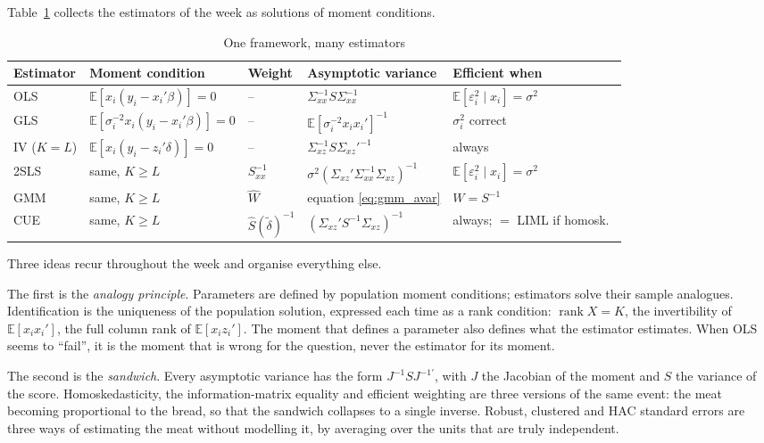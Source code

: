\documentclass[11pt,a4paper]{article}
\newcommand{\E}{\mathbb{E}}
\newcommand{\rank}{\operatorname{rank}}
\newcommand{\Sxx}{S_{xx}}
\newcommand{\sxx}{\Sigma_{xx}}
\newcommand{\sxz}{\Sigma_{xz}}
\begin{document}
Table~\ref{tab:synth} collects the estimators of the week as solutions of moment conditions.

\begin{table}[h]
\centering\footnotesize
\setlength{\tabcolsep}{4pt}
\caption{One framework, many estimators}\label{tab:synth}
\begin{tabular}{@{}lllll@{}}
\toprule
Estimator & Moment condition & Weight & Asymptotic variance & Efficient when \\
\midrule
OLS & $\E[x_i(y_i-x_i'\beta)]=0$ & -- & $\sxx^{-1}S\sxx^{-1}$ & $\E[\varepsilon_i^2\mid x_i]=\sigma^2$ \\
GLS & $\E[\sigma_i^{-2}x_i(y_i-x_i'\beta)]=0$ & -- & $\E[\sigma_i^{-2}x_ix_i']^{-1}$ & $\sigma_i^2$ correct \\
IV ($K=L$) & $\E[x_i(y_i-z_i'\delta)]=0$ & -- & $\sxz^{-1}S\sxz'^{-1}$ & always \\
2SLS & same, $K\geq L$ & $\Sxx^{-1}$ & $\sigma^2(\sxz'\sxx^{-1}\sxz)^{-1}$ & $\E[\varepsilon_i^2\mid x_i]=\sigma^2$ \\
GMM & same, $K\geq L$ & $\hat W$ & equation \eqref{eq:gmm_avar} & $W=S^{-1}$ \\
CUE & same, $K\geq L$ & $\hat S(\tilde\delta)^{-1}$ & $(\sxz'S^{-1}\sxz)^{-1}$ & always; $=$ LIML if homosk.\ \\
\bottomrule
\end{tabular}
\end{table}

Three ideas recur throughout the week and organise everything else.

The first is the \emph{analogy principle}. Parameters are defined by population moment conditions; estimators solve their sample analogues. Identification is the uniqueness of the population solution, expressed each time as a rank condition: $\rank X=K$, the invertibility of $\E[x_ix_i']$, the full column rank of $\E[x_iz_i']$. The moment that defines a parameter also defines what the estimator estimates. When OLS seems to ``fail'', it is the moment that is wrong for the question, never the estimator for its moment.

The second is the \emph{sandwich}. Every asymptotic variance has the form $J^{-1}SJ^{-1\prime}$, with $J$ the Jacobian of the moment and $S$ the variance of the score. Homoskedasticity, the information-matrix equality and efficient weighting are three versions of the same event: the meat becoming proportional to the bread, so that the sandwich collapses to a single inverse. Robust, clustered and HAC standard errors are three ways of estimating the meat without modelling it, by averaging over the units that are truly independent.
\end{document}
